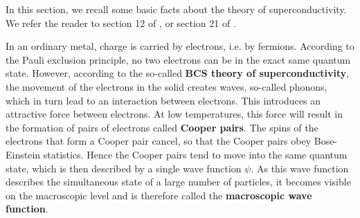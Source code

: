 \documentclass[a4paper, draft]{article}
\theoremstyle{own}
\theoremstyle{remark}
\begin{document}
In this section, we recall some basic facts about the theory of superconductivity. We refer the reader to section 12 of \cite{Kittel}, \cite{GrossMarxLectureNotes} or section 21 of \cite{FeynmanIII}.

In an ordinary metal, charge is carried by electrons, i.e. by fermions. According to the Pauli exclusion principle, no two electrons can be in the exact same quantum state. However, according to the so-called {\bf BCS theory of superconductivity}, the movement of the electrons in the solid creates waves, so-called phonons, which in turn lead to an interaction between electrons. This introduces an attractive force between electrons. At low temperatures, this force will result in the formation of pairs of electrons called {\bf Cooper pairs}. The spins of the electrons that form a Cooper pair cancel, so that the Cooper pairs obey Bose-Einstein statistics. Hence the Cooper pairs tend to move into the same quantum state, which is then described by a single wave function $\psi$. As this wave function describes the simultaneous state of a large number of particles, it becomes visible on the macroscopic level and is therefore called the {\bf macroscopic wave function}. 
\end{document}
